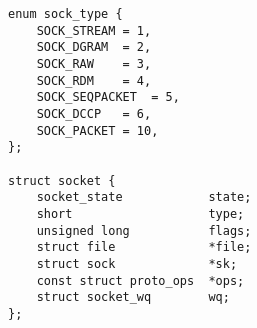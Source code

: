 
\begin{lstlisting}
enum sock_type {
    SOCK_STREAM	= 1,
    SOCK_DGRAM	= 2,
    SOCK_RAW	= 3,
    SOCK_RDM	= 4,
    SOCK_SEQPACKET	= 5,
    SOCK_DCCP	= 6,
    SOCK_PACKET	= 10,
};

struct socket {
	socket_state		    state;
	short			        type;
	unsigned long		    flags;
	struct file		        *file;
	struct sock		        *sk;
	const struct proto_ops	*ops;
	struct socket_wq	    wq;
};
\end{lstlisting}

